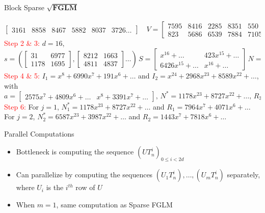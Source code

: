 \documentclass[final]{beamer}
\newlength{\twocolwid}
\begin{document}
\begin{frame}[t]
\begin{columns}[t]
\begin{column}{\twocolwid}
\begin{block}{Block Sparse $\mathbf{\sqrt{FGLM}}$}
\begin{example}
$$\begin{bmatrix}
		3161 &8858 &8467 &5882 &8037 &3726 \dots
		\end{bmatrix} \quad
		V = \begin{bmatrix}
		7595 &8416 &2285 &8351 & 550 &7012 \dots \\
		823 &5686 &6539 &7884 &7105 &3427 \dots 
		\end{bmatrix}^t
		$$
		\textcolor{red}{Step 2 \& 3: } $d = 16$,
		$$ s = \left(
		\begin{bmatrix}
		31  & 6977\\
		1178& 1695
		\end{bmatrix},
		\begin{bmatrix}
		8212&1663\\
		4811&4837
		\end{bmatrix}
		\dots
		\right)\,
		S = \begin{bmatrix}
		x^{16} + \dots & 423x^{15} +\dots\\
		6426x^{15}+ \dots & x^{16} + \dots
		\end{bmatrix} \,
		N = \begin{bmatrix}
		6191/x^{16} + \dots & 8101/x^{16} + \dots\\
		7116/x^{16} + \dots & 2129/x^{16} + \dots
		\end{bmatrix}
		$$
		\textcolor{red}{Step 4 \& 5:}
		$I_1 = x^{8} + 6990x^{7} + 191x^{6} + \dots$ and $I_2 = x^{24} + 2968x^{23}+ 8589x^{22} + \dots$, with
		$$ a = \begin{bmatrix}
		2575x^7+4809x^6+\dots & x^8 + 3391x^7+\dots
		\end{bmatrix},\,
		N^* = 1178x^{23} + 8727x^{22} + \dots, \,
		R_3 = x^8 + 6990x^7 + \dots
		$$
		\textcolor{red}{Step 6: } For $j = 1$, $N^*_1 = 1178x^{23} + 8727x^{22} + \dots$ and
		$R_1 = 7964x^7 + 4071x^6 + \dots$\\
		\hspace{1cm}\hspace{1cm}\hspace{1cm}\hspace{1cm}\hspace{0.3cm}
		For $j = 2$, $N^*_2 = 6587x^{23}+3987x^{22} + \dots$ and 
		$R_2 = 1443x^7 + 7818x^6 + \dots$
	
	\end{example}
\end{block}

\begin{alertblock}{Parallel Computations}
	\begin{itemize}
		\item Bottleneck is computing the sequence $(UT_n^i)_{0 \le i < 2d}$
		\item Can parallelize by computing the sequences $(U_1T_n^i),\dots,(U_mT_n^i)$
		separately, where $U_i$ is the $i^{th}$ row of $U$
		\item When $m=1$, same computation as Sparse FGLM
	\end{itemize}
\end{alertblock}


\end{column}
\end{columns}
\end{frame}
\end{document}

